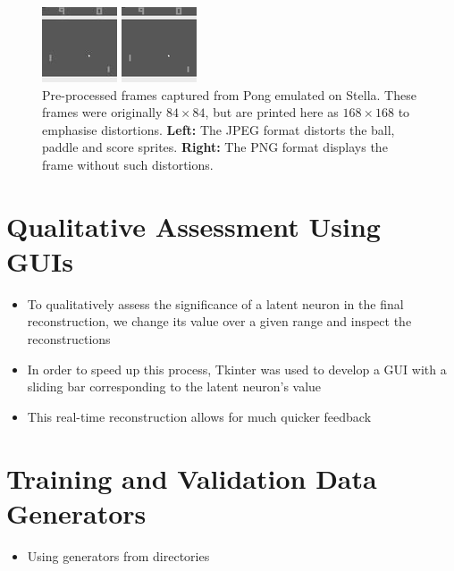 \begin{figure}[h!]
\centering
\captionsetup{justification=centering}
\begin{multicols}{1}
    \includegraphics[scale=2.0]{figures/related_work/pong_729_pre_processed.jpeg}\par
    \includegraphics[scale=2.0]{figures/related_work/pong_729_pre_processed.png}\par
\end{multicols}
\caption{Pre-processed frames captured from Pong emulated on Stella. These frames were originally $84\times 84$, but are printed here as $168\times 168$ to emphasise distortions. \textbf{Left:} The JPEG format distorts the ball, paddle and score sprites. \textbf{Right:} The PNG format displays the frame without such distortions.}
\label{fig:pong_729_pre_processed}
\end{figure}


%
%
%
%
%
\section{Qualitative Assessment Using GUIs}
\begin{itemize}
\item To qualitatively assess the significance of a latent neuron in the final reconstruction, we change its value over a given range and inspect the reconstructions
\item In order to speed up this process, Tkinter was used to develop a GUI with a sliding bar corresponding to the latent neuron's value
\item This real-time reconstruction allows for much quicker feedback
\end{itemize}


%
%
%
%
%
\section{Training and Validation Data Generators}
\begin{itemize}
\item Using generators from directories
\end{itemize}


